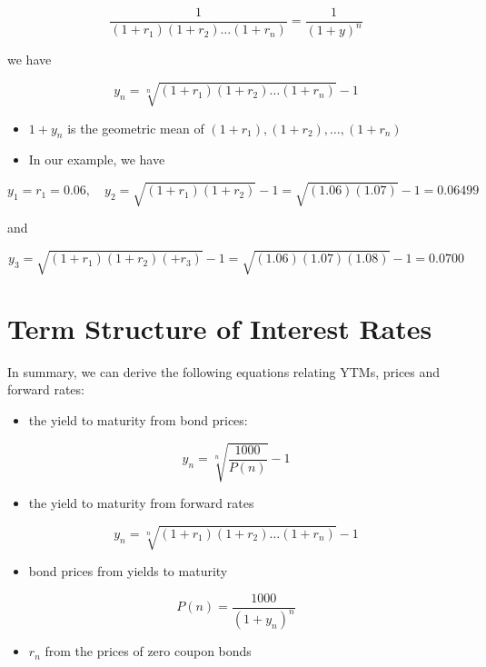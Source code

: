\documentclass[letterpaper]{article}
\begin{document}
$$
\frac{1}{\left(1+r_{1}\right)\left(1+r_{2}\right) \ldots\left(1+r_{n}\right)}=\frac{1}{(1+y)^{n}}
$$

we have

$$
y_{n}=\sqrt[n]{\left(1+r_{1}\right)\left(1+r_{2}\right) \ldots\left(1+r_{n}\right)}-1
$$

\begin{itemize}
  \item $1+y_{n}$ is the geometric mean of $\left(1+r_{1}\right),\left(1+r_{2}\right), \ldots,\left(1+r_{n}\right)$
  \item In our example, we have
\end{itemize}

$$
y_{1}=r_{1}=0.06, \quad y_{2}=\sqrt{\left(1+r_{1}\right)\left(1+r_{2}\right)}-1=\sqrt{(1.06)(1.07)}-1=0.06499
$$

and

$$
y_{3}=\sqrt{\left(1+r_{1}\right)\left(1+r_{2}\right)\left(+r_{3}\right)}-1=\sqrt{(1.06)(1.07)(1.08)}-1=0.0700
$$

\section*{Term Structure of Interest Rates}
In summary, we can derive the following equations relating YTMs, prices and forward rates:

\begin{itemize}
  \item the yield to maturity from bond prices:
\end{itemize}

$$
y_{n}=\sqrt[n]{\frac{1000}{P(n)}}-1
$$

\begin{itemize}
  \item the yield to maturity from forward rates
\end{itemize}

$$
y_{n}=\sqrt[n]{\left(1+r_{1}\right)\left(1+r_{2}\right) \ldots\left(1+r_{n}\right)}-1
$$

\begin{itemize}
  \item bond prices from yields to maturity
\end{itemize}

$$
P(n)=\frac{1000}{\left(1+y_{n}\right)^{n}}
$$

\begin{itemize}
  \item $r_{n}$ from the prices of zero coupon bonds
\end{itemize}
\end{document}
